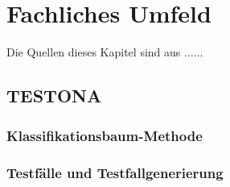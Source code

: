 \chapter{Fachliches Umfeld}\label{chp:fachlichesumfeld}
Die Quellen dieses Kapitel sind aus ......

\section{TESTONA}\label{sec:Testona} 
\paragraph{}



\subsection{Klassifikationsbaum-Methode}
\paragraph{}

\subsection{Testfälle und Testfallgenerierung}
\paragraph{}



